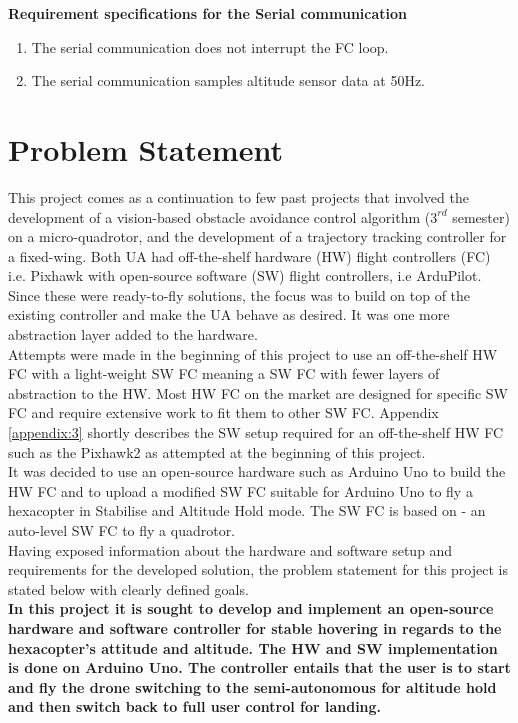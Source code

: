 \noindent \textbf{Requirement specifications for the Serial communication}

\begin{enumerate}
    \item The serial communication does not interrupt the FC loop.
    \item The serial communication samples altitude sensor data at 50Hz. 
\end{enumerate}

\section{Problem Statement}
This project comes as a continuation to few past projects that involved the development of a vision-based obstacle avoidance control algorithm\cite{p4project} ($3^{rd}$ semester) on a micro-quadrotor, and the development of a trajectory tracking controller for a fixed-wing\cite{p5project}. Both UA had off-the-shelf hardware (HW) flight controllers (FC) i.e. Pixhawk with open-source software (SW) flight controllers, i.e ArduPilot. Since these were ready-to-fly solutions, the focus was to build on top of the existing controller and make the UA behave as desired. It was one more abstraction layer added to the hardware.\\

\noindent Attempts were made in the beginning of this project to use an off-the-shelf HW FC with a light-weight SW FC meaning a SW FC with fewer layers of abstraction to the HW. Most HW FC on the market are designed for specific SW FC and require extensive work to fit them to other SW FC. Appendix \ref{appendix:3} shortly describes the SW setup required for an off-the-shelf HW FC such as the Pixhawk2 as attempted at the beginning of this project.\\

\noindent It was decided to use an open-source hardware such as Arduino Uno to build the HW FC and to upload a modified SW FC suitable for Arduino Uno to fly a hexacopter in Stabilise and Altitude Hold mode. The SW FC is based on \cite{website:ymfc} - an auto-level SW FC to fly a quadrotor.\\

\noindent Having exposed information about the hardware and software setup and requirements for the developed solution, the problem statement for this project is stated below with clearly defined goals.\\ 

\noindent \textbf{In this project it is sought to develop and implement an open-source hardware and software controller for stable hovering in regards to the hexacopter's attitude and altitude. The HW and SW implementation is done on Arduino Uno. The controller entails that the user is to start and fly the drone switching to the semi-autonomous for altitude hold and then switch back to full user control for landing.}\\

